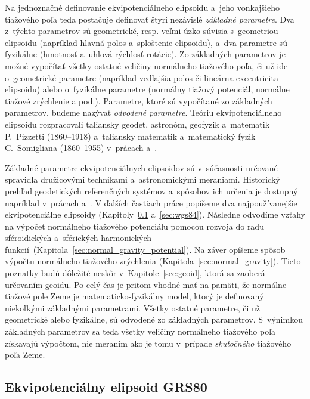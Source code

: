 \documentclass[a4paper, 12pt]{book}
\begin{document}
Na jednoznačné definovanie ekvipotenciálneho elipsoidu a~jeho vonkajšieho 
tiažového poľa teda postačuje definovať štyri nezávislé \emph{základné 
parametre}.  Dva z~týchto parametrov sú geometrické, resp. veľmi úzko súvisia 
s~geometriou elipsoidu (napríklad hlavná polos a~sploštenie elipsoidu), a~dva 
parametre sú fyzikálne (hmotnosť a~uhlová rýchlosť rotácie).  Zo základných 
parametrov je možné vypočítať všetky ostatné veličiny normálneho tiažového 
poľa, či už ide o~geometrické parametre (napríklad vedľajšia polos či lineárna 
excentricita elipsoidu) alebo o~fyzikálne parametre (normálny tiažový 
potenciál, normálne tiažové zrýchlenie a pod.).  Parametre, ktoré sú vypočítané 
zo základných parametrov, budeme nazývať \emph{odvodené parametre}.  Teóriu 
ekvipotenciálneho elipsoidu rozpracovali taliansky geodet, astronóm, geofyzik 
a~matematik P.~Pizzetti (1860--1918) a~taliansky matematik a~matematický fyzik 
C.~Somigliana (1860--1955) v~prácach \textcite{Pizzetti1984} 
a~\textcite{Somigliana1929}.

Základné parametre ekvipotenciálnych elipsoidov sú v~súčasnosti určované 
spravidla družicovými technikami a~astronomickými meraniami.  Historický 
prehľad geodetických referenčných systémov a~spôsobov ich určenia je dostupný 
napríklad v~prácach \textcite{TorgeGeodesy} a~\textcite{MoritzPhysicalGeodesy}.  
V ďalších častiach práce popíšeme dva najpoužívanejšie ekvipotenciálne 
elipsoidy (Kapitoly~\ref{sec:grs80} a~\ref{sec:wgs84}).  Následne odvodíme 
vzťahy na výpočet normálneho tiažového potenciálu pomocou rozvoja do radu 
sféroidických a~sférických harmonických 
funkcií~(Kapitola~\ref{sec:normal_gravity_potential}).  Na záver opíšeme spôsob 
výpočtu normálneho tiažového zrýchlenia (Kapitola~\ref{sec:normal_gravity}).  
Tieto poznatky budú dôležité neskôr v~Kapitole~\ref{sec:geoid}, ktorá sa 
zaoberá určovaním geoidu.  Po celý čas je pritom vhodné mať na pamäti, že 
normálne tiažové pole Zeme je matematicko-fyzikálny model, ktorý je definovaný 
niekoľkými základnými parametrami.  Všetky ostatné parametre, či už geometrické 
alebo fyzikálne, sú odvodené zo základných parametrov.  S~výnimkou základných 
parametrov sa teda všetky veličiny normálneho tiažového poľa získavajú 
výpočtom, nie meraním ako je tomu v~prípade \emph{skutočného} tiažového poľa 
Zeme.





\subsection{Ekvipotenciálny elipsoid GRS80}
\label{sec:grs80}
\end{document}

